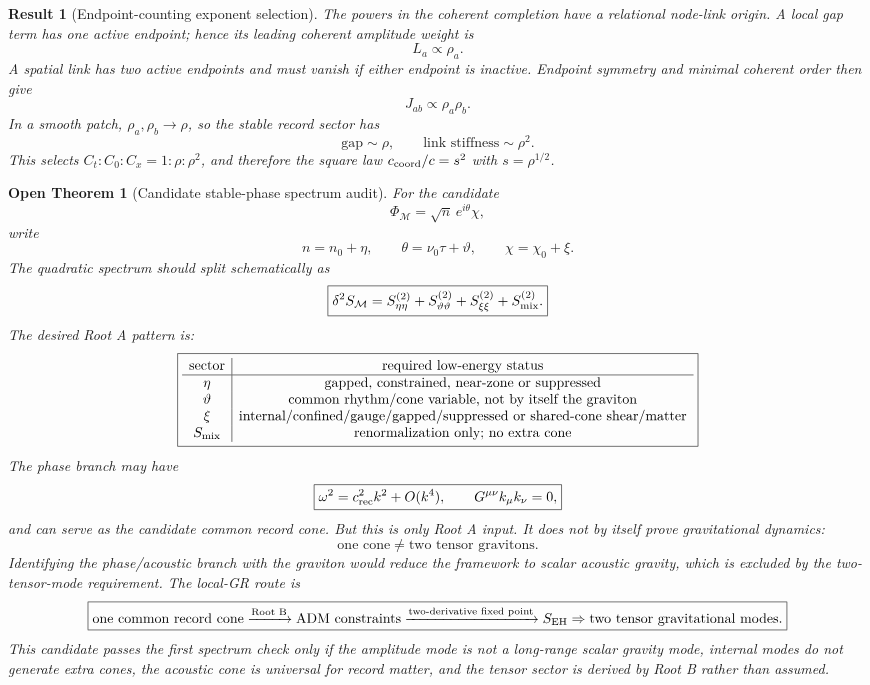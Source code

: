 \documentclass[11pt]{article}
\newtheorem{result}{Result}
\newtheorem{openthm}{Open Theorem}
\begin{document}
\begin{result}[Endpoint-counting exponent selection]
The powers in the coherent completion have a relational node-link origin.  A
local gap term has one active endpoint; hence its leading coherent amplitude
weight is
\[
\boxed{
L_a\propto \rho_a.
}
\]
A spatial link has two active endpoints and must vanish if either endpoint is
inactive.  Endpoint symmetry and minimal coherent order then give
\[
\boxed{
J_{ab}\propto \rho_a\rho_b.
}
\]
In a smooth patch, \(\rho_a,\rho_b\to\rho\), so the stable record sector has
\[
\boxed{
\text{gap}\sim\rho,\qquad \text{link stiffness}\sim\rho^2.
}
\]
This selects \(C_t:C_0:C_x=1:\rho:\rho^2\), and therefore the square law
\(c_{\rm coord}/c=s^2\) with \(s=\rho^{1/2}\).
\end{result}

\begin{openthm}[Candidate stable-phase spectrum audit]
For the candidate
\[
\boxed{
\Phi_{\mathcal M}=\sqrt n\,e^{i\theta}\chi,
}
\]
write
\[
\boxed{
n=n_0+\eta,
\qquad
\theta=\nu_0\tau+\vartheta,
\qquad
\chi=\chi_0+\xi.
}
\]
The quadratic spectrum should split schematically as
\[
\boxed{
\delta^2S_{\mathcal M}
=
S_{\eta\eta}^{(2)}
+S_{\vartheta\vartheta}^{(2)}
+S_{\xi\xi}^{(2)}
+S_{\rm mix}^{(2)}.
}
\]
The desired Root A pattern is:
\[
\boxed{
\begin{array}{c|c}
\text{sector} & \text{required low-energy status}\\
\hline
\eta & \text{gapped, constrained, near-zone or suppressed}\\
\vartheta & \text{common rhythm/cone variable, not by itself the graviton}\\
\xi & \text{internal/confined/gauge/gapped/suppressed or shared-cone shear/matter}\\
S_{\rm mix} & \text{renormalization only; no extra cone}
\end{array}
}
\]
The phase branch may have
\[
\boxed{
\omega^2=c_{\rm rec}^2k^2+O(k^4),
\qquad
G^{\mu\nu}k_\mu k_\nu=0,
}
\]
and can serve as the candidate common record cone.  But this is only Root A
input.  It does not by itself prove gravitational dynamics:
\[
\boxed{
\text{one cone}\neq\text{two tensor gravitons}.
}
\]
Identifying the phase/acoustic branch with the graviton would reduce the
framework to scalar acoustic gravity, which is excluded by the
two-tensor-mode requirement.  The local-GR route is
\[
\boxed{
\text{one common record cone}
\xrightarrow{\text{Root B}}
\text{ADM constraints}
\xrightarrow{\text{two-derivative fixed point}}
S_{\rm EH}
\Rightarrow
\text{two tensor gravitational modes}.
}
\]
This candidate passes the first spectrum check only if the amplitude mode is
not a long-range scalar gravity mode, internal modes do not generate extra
cones, the acoustic cone is universal for record matter, and the tensor sector
is derived by Root B rather than assumed.
\end{openthm}
\end{document}
